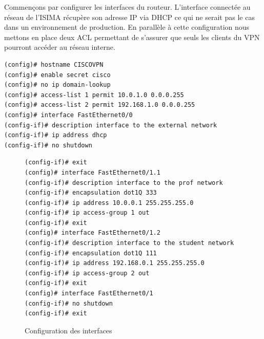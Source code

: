 Commençons par configurer les interfaces du routeur. L'interface connectée au réseau de l'ISIMA récupère son adresse IP via DHCP ce qui ne serait pas le cas dans un environnement de production. En parallèle à cette configuration nous mettons en place deux ACL permettant de s'assurer que seuls les clients du VPN pourront accéder au réseau interne.
	\begin{center}
		\begin{minipage}{0.90\textwidth}
			\begin{lstlisting}[frame=trBL]
(config)# hostname CISCOVPN
(config)# enable secret cisco
(config)# no ip domain-lookup
(config)# access-list 1 permit 10.0.1.0 0.0.0.255
(config)# access-list 2 permit 192.168.1.0 0.0.0.255
(config)# interface FastEthernet0/0
(config-if)# description interface to the external network
(config-if)# ip address dhcp
(config-if)# no shutdown
			\end{lstlisting}
		\end{minipage}
	\end{center}
\begin{figure}[H]
	\begin{center}
		\begin{minipage}{0.90\textwidth}
			\begin{lstlisting}[frame=trBL]
(config-if)# exit
(config)# interface FastEthernet0/1.1
(config-if)# description interface to the prof network
(config-if)# encapsulation dot1Q 333
(config-if)# ip address 10.0.0.1 255.255.255.0
(config-if)# ip access-group 1 out
(config-if)# exit
(config)# interface FastEthernet0/1.2
(config-if)# description interface to the student network
(config-if)# encapsulation dot1Q 111
(config-if)# ip address 192.168.0.1 255.255.255.0
(config-if)# ip access-group 2 out
(config-if)# exit
(config)# interface FastEthernet0/1
(config-if)# no shutdown
(config-if)# exit
			\end{lstlisting}
		\end{minipage}
	\end{center}
	\caption{Configuration des interfaces}
	\label{configuration_interfaces}
\end{figure}

~

